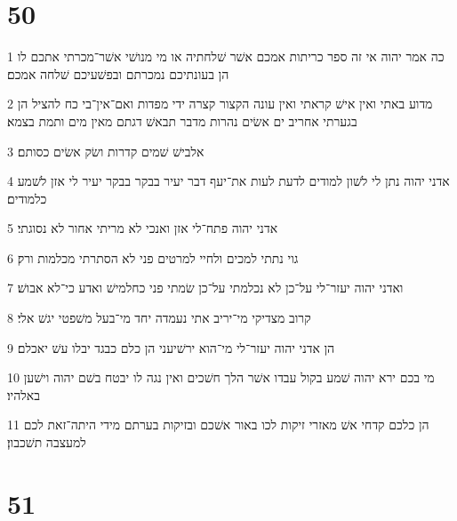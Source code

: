 \chapter{50}

\par 1 כה אמר יהוה אי זה ספר כריתות אמכם אשׁר שׁלחתיה או מי מנושׁי אשׁר־מכרתי אתכם לו הן בעונתיכם נמכרתם ובפשׁעיכם שׁלחה אמכם׃
\par 2 מדוע באתי ואין אישׁ קראתי ואין עונה הקצור קצרה ידי מפדות ואם־אין־בי כח להציל הן בגערתי אחריב ים אשׂים נהרות מדבר תבאשׁ דגתם מאין מים ותמת בצמא׃
\par 3 אלבישׁ שׁמים קדרות ושׂק אשׂים כסותם׃
\par 4 אדני יהוה נתן לי לשׁון למודים לדעת לעות את־יעף דבר יעיר בבקר בבקר יעיר לי אזן לשׁמע כלמודים׃
\par 5 אדני יהוה פתח־לי אזן ואנכי לא מריתי אחור לא נסוגתי׃
\par 6 גוי נתתי למכים ולחיי למרטים פני לא הסתרתי מכלמות ורק׃
\par 7 ואדני יהוה יעזר־לי על־כן לא נכלמתי על־כן שׂמתי פני כחלמישׁ ואדע כי־לא אבושׁ׃
\par 8 קרוב מצדיקי מי־יריב אתי נעמדה יחד מי־בעל משׁפטי יגשׁ אלי׃
\par 9 הן אדני יהוה יעזר־לי מי־הוא ירשׁיעני הן כלם כבגד יבלו עשׁ יאכלם׃
\par 10 מי בכם ירא יהוה שׁמע בקול עבדו אשׁר הלך חשׁכים ואין נגה לו יבטח בשׁם יהוה וישׁען באלהיו׃
\par 11 הן כלכם קדחי אשׁ מאזרי זיקות לכו באור אשׁכם ובזיקות בערתם מידי היתה־זאת לכם למעצבה תשׁכבון׃

\chapter{51}

